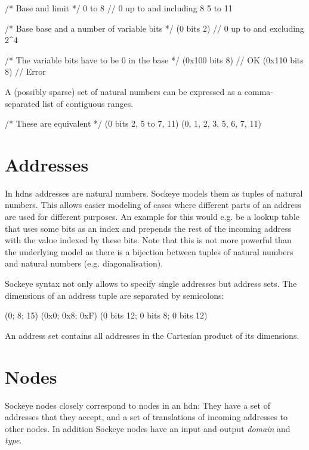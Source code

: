 \documentclass[a4paper,11pt,twoside]{report}
\begin{document}
{{{\begin{example}
  /* Base and limit */
  0 to 8 // 0 up to and including 8
  5 to 11

  /* Base base and a number of variable bits */
  (0 bits 2) // 0 up to and excluding 2^4

  /* The variable bits have to be 0 in the base */
  (0x100 bits 8) // OK
  (0x110 bits 8) // Error
\end{example}

A (possibly sparse) set of natural numbers can be expressed as a comma-separated list of contiguous ranges.
\begin{example}
  /* These are equivalent */
  (0 bits 2, 5 to 7, 11)
  (0, 1, 2, 3, 5, 6, 7, 11)
\end{example}

\section{Addresses}
In \glspl{hdn} addresses are natural numbers.
Sockeye models them as tuples of natural numbers.
This allows easier modeling of cases where different parts of an address are used for different purposes.
An example for this would e.g. be a lookup table that uses some bits as an index and prepends the rest of the incoming address with the value indexed by these bits.
Note that this is not more powerful than the underlying model as there is a bijection between tuples of natural numbers and natural numbers (e.g. diagonalisation).

Sockeye syntax not only allows to specify single addresses but address sets.
The dimensions of an address tuple are separated by semicolons:
\begin{example}
  (0; 8; 15)
  (0x0; 0x8; 0xF)
  (0 bits 12; 0 bits 8; 0 bits 12)
\end{example}

An address set contains all addresses in the Cartesian product of its dimensions.

\section{Nodes}
Sockeye nodes closely correspond to nodes in an \gls{hdn}:
They have a set of addresses that they accept, and a set of translations of incoming addresses to other nodes.
In addition Sockeye nodes have an input and output \emph{domain} and \emph{type}.

}}}
\end{document}

